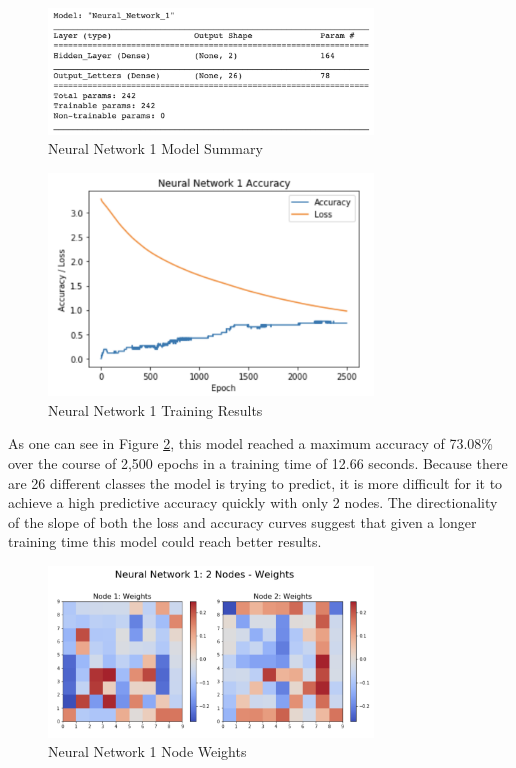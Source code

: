 \documentclass[5p,authoryear]{elsarticle}
\begin{document}
\begin{figure}[!htb] \centering
	\includegraphics[width=3.4in]{figures/nn1 sum.png}
	\caption[]{Neural Network 1 Model Summary} 
	\label{test1b} 
\end{figure}

\begin{figure}[!htb] \centering
	\includegraphics[width=3.4in]{figures/nn1 plot.png}
	\caption[]{Neural Network 1 Training Results} 
	\label{test1c}
\end{figure}

As one can see in Figure \ref{test1c}, this model reached a maximum accuracy of 73.08\% over the course of 2,500 epochs in a training time of 12.66 seconds. 
Because there are 26 different classes the model is trying to predict, it is more difficult for it to achieve a high predictive accuracy quickly with only 2 nodes. 
The directionality of the slope of both the loss and accuracy curves suggest that given a longer training time this model could reach better results. 

\begin{figure}[!htb] \centering
	\includegraphics[width=3.4in]{figures/nn1_weights.png}
	\caption[]{Neural Network 1 Node Weights} 
	\label{test1d}
\end{figure}
\end{document}
